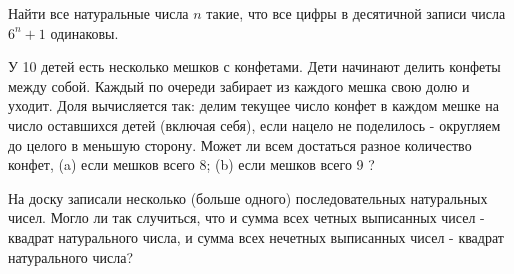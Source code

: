 Найти все натуральные числа $n$ такие, что все цифры в десятичной записи числа $6^n+1$ одинаковы.

\newpage

\hspace{3mm}

У 10 детей есть несколько мешков с конфетами. Дети начинают делить конфеты между собой. Каждый по очереди забирает из каждого мешка свою долю и уходит. Доля вычисляется так: делим текущее число конфет в каждом мешке на число оставшихся детей (включая себя), если нацело не поделилось - округляем до целого в меньшую сторону. Может ли всем достаться разное количество конфет, (a) если мешков всего 8; (b) если мешков всего 9 ?

На доску записали несколько (больше одного) последовательных натуральных чисел. Могло ли так случиться, что и сумма всех четных выписанных чисел - квадрат натурального числа, и сумма всех нечетных выписанных чисел - квадрат натурального числа?